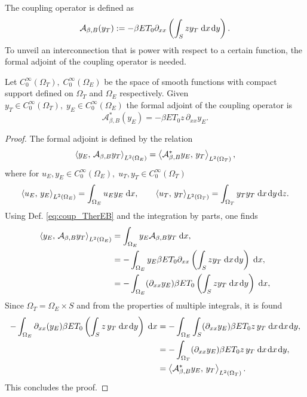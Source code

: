 The coupling operator is defined as
\begin{equation}\label{eq:coup_TherEB}
	\mathcal{A}_{\beta, B}(y_T) := - \beta E T_0 \partial_{xx} \left(\int_S z y_T \d{x}\d{y}\right).
\end{equation}
To unveil an interconnection that is power with respect to a certain function, the formal adjoint of the coupling operator is needed.
\begin{proposition}\label{prop:adjcoup_TherEB}
	Let $C_0^{\infty}(\Omega_T), \; C_0^{\infty}(\Omega_E)$ be the space of smooth functions with compact support defined on $\Omega_T$ and $\Omega_E$ respectively. Given $y_T \in C_0^{\infty}(\Omega_T), \; y_E \in C_0^{\infty}(\Omega_E)$ the formal adjoint of the coupling operator is 
	\begin{equation}\label{eq:adjcoup_TherEB}
		\mathcal{A}_{\beta, B}^*(y_E) = -\beta E T_0 z \, \partial_{xx} y_E.
	\end{equation}
	\begin{proof}
		The formal adjoint is defined by the relation
		\begin{equation}
		\inner[L^2(\Omega_E)]{y_E}{\mathcal{A}_{\beta, B}y_T}= \inner[L^2(\Omega_T)]{\mathcal{A}_{\beta, B}^* y_E}{y_T},
		\end{equation}
		where for $u_E, y_E \in C_0^{\infty}(\Omega_E), \; u_T, y_T \in C_0^{\infty}(\Omega_T)$
		\begin{equation}
		\inner[L^2(\Omega_E)]{u_E}{y_E} = \int_{\Omega_E} u_E y_E \d{x}, \qquad \inner[L^2(\Omega_T)]{u_T}{y_T} = \int_{\Omega_T} y_T y_T \d{x}\d{y}\d{z}.
		\end{equation}
		Using Def. \eqref{eq:coup_TherEB} and the integration by parts, one finds
		\begin{equation}
		\begin{aligned}
		\inner[L^2(\Omega_E)]{y_E}{\mathcal{A}_{\beta, B}y_T}&=\int_{\Omega_E} y_E \mathcal{A}_{\beta, B}y_T \d{x}, \\
		&= -\int_{\Omega_E} y_E \beta E T_0 \partial_{xx} \left(\int_S z y_T \d{x}\d{y}\right) \d{x}, \\
		&= -\int_{\Omega_E} (\partial_{xx} y_E) \beta E T_0 \left(\int_S z y_T \d{x}\d{y}\right) \d{x}, \\
		\end{aligned}
		\end{equation}
		Since $\Omega_T = \Omega_E \times S$ and from the properties of multiple integrals, it is found
		\begin{equation}
		\begin{aligned}
		-\int_{\Omega_E} \partial_{xx} (y_E) \beta E T_0 \left(\int_S z\, y_T \d{x}\d{y}\right) \d{x} &= -\int_{\Omega_E}\int_S  (\partial_{xx} y_E) \beta E T_0 z \, y_T \d{x}\d{x}\d{y}, \\
		&= -\int_{\Omega_T}(\partial_{xx} y_E) \beta E T_0 z \, y_T \d{x}\d{x}\d{y}, \\
		&=	\inner[L^2(\Omega_T)]{\mathcal{A}_{\beta, B}^* y_E}{y_T}.
		\end{aligned}
		\end{equation}
		This concludes the proof.
	\end{proof}
\end{proposition}

